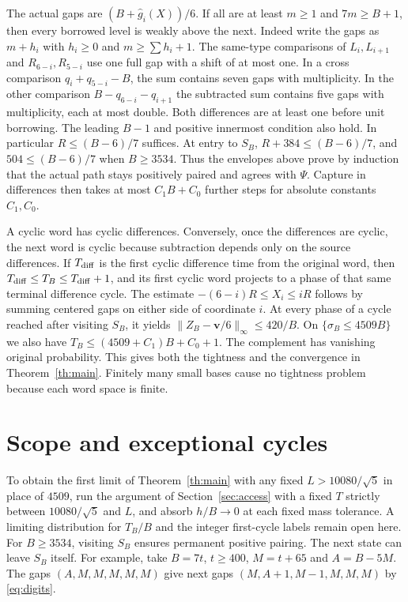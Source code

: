 \documentclass[11pt,reqno]{amsart}
\theoremstyle{remark}
\newcommand{\vct}{\boldsymbol v}
\begin{document}
The actual gaps are \((B+\widehat g_i(X))/6\). If all are at least \(m\ge1\) and \(7m\ge B+1\), then every borrowed level is weakly above the next. Indeed write the gaps as \(m+h_i\) with \(h_i\ge0\) and \(m\ge \sum h_i+1\). The same-type comparisons of \(L_i,L_{i+1}\) and \(R_{6-i},R_{5-i}\) use one full gap with a shift of at most one. In a cross comparison \(q_i+q_{5-i}-B\), the sum contains seven gaps with multiplicity. In the other comparison \(B-q_{6-i}-q_{i+1}\) the subtracted sum contains five gaps with multiplicity, each at most double. Both differences are at least one before unit borrowing. The leading \(B-1\) and positive innermost condition also hold. In particular \(R\le(B-6)/7\) suffices. At entry to \(S_B\), \(R+384\le(B-6)/7\), and \(504\le(B-6)/7\) when \(B\ge3534\). Thus the envelopes above prove by induction that the actual path stays positively paired and agrees with \(\Psi\). Capture in differences then takes at most \(C_1B+C_0\) further steps for absolute constants \(C_1,C_0\).

A cyclic word has cyclic differences. Conversely, once the differences are cyclic, the next word is cyclic because subtraction depends only on the source differences. If \(T_{\rm diff}\) is the first cyclic difference time from the original word, then \(T_{\rm diff}\le T_B\le T_{\rm diff}+1\), and its first cyclic word projects to a phase of that same terminal difference cycle. The estimate \(-(6-i)R\le X_i\le iR\) follows by summing centered gaps on either side of coordinate \(i\). At every phase of a cycle reached after visiting \(S_B\), it yields \(\|Z_B-\vct/6\|_\infty\le420/B\). On \(\{\sigma_B\le4509B\}\) we also have \(T_B\le (4509+C_1)B+C_0+1\). The complement has vanishing original probability. This gives both the tightness and the convergence in Theorem~\ref{th:main}. Finitely many small bases cause no tightness problem because each word space is finite.

\section{Scope and exceptional cycles}\label{sec:scope}

To obtain the first limit of Theorem~\ref{th:main} with any fixed \(L>10080/\sqrt5\) in place of \(4509\), run the argument of Section~\ref{sec:access} with a fixed \(T\) strictly between \(10080/\sqrt5\) and \(L\), and absorb \(h/B\to0\) at each fixed mass tolerance. A limiting distribution for \(T_B/B\) and the integer first-cycle labels remain open here. For \(B\ge3534\), visiting \(S_B\) ensures permanent positive pairing. The next state can leave \(S_B\) itself. For example, take \(B=7t\), \(t\ge400\), \(M=t+65\) and \(A=B-5M\). The gaps \((A,M,M,M,M,M)\) give next gaps \((M,A+1,M-1,M,M,M)\) by \eqref{eq:digits}.
\end{document}
